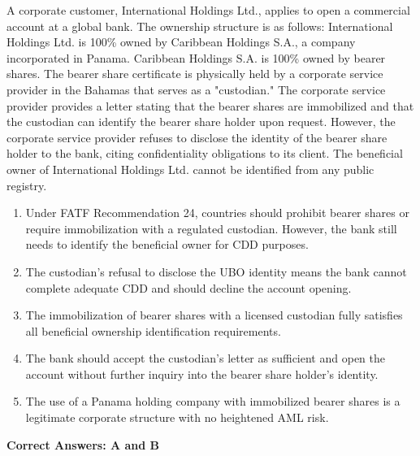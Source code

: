 \documentclass[11pt,a4paper]{article}
\begin{document}
	A corporate customer, International Holdings Ltd., applies to open a commercial account at a global bank. The ownership structure is as follows: International Holdings Ltd. is 100\% owned by Caribbean Holdings S.A., a company incorporated in Panama. Caribbean Holdings S.A. is 100\% owned by bearer shares. The bearer share certificate is physically held by a corporate service provider in the Bahamas that serves as a "custodian." The corporate service provider provides a letter stating that the bearer shares are immobilized and that the custodian can identify the bearer share holder upon request. However, the corporate service provider refuses to disclose the identity of the bearer share holder to the bank, citing confidentiality obligations to its client. The beneficial owner of International Holdings Ltd. cannot be identified from any public registry.
	
	\begin{enumerate}[label=\Alph*.]
		\item Under FATF Recommendation 24, countries should prohibit bearer shares or require immobilization with a regulated custodian. However, the bank still needs to identify the beneficial owner for CDD purposes.
		\item The custodian's refusal to disclose the UBO identity means the bank cannot complete adequate CDD and should decline the account opening.
		\item The immobilization of bearer shares with a licensed custodian fully satisfies all beneficial ownership identification requirements.
		\item The bank should accept the custodian's letter as sufficient and open the account without further inquiry into the bearer share holder's identity.
		\item The use of a Panama holding company with immobilized bearer shares is a legitimate corporate structure with no heightened AML risk.
	\end{enumerate}
	
	\textbf{Correct Answers: A and B}
	
\end{document}

